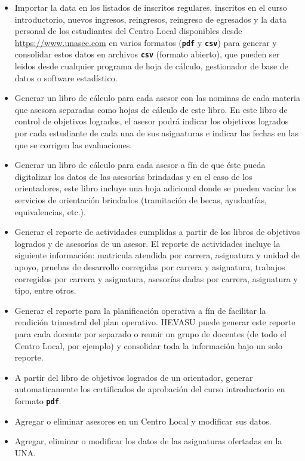 \documentclass[letterpaper,12pt]{book}
\newcommand{\fileformat}[1]{\textbf{\texttt{#1}}}
\begin{document}
\begin{itemize}
	\item Importar la data en los listados de inscritos regulares, inscritos en el curso introductorio, nuevos ingresos, reingresos, reingreso de egresados y la data personal de los estudiantes del Centro Local disponibles desde \url{https://www.unasec.com} en varios formatos (\fileformat{pdf} y \fileformat{csv}) para generar y consolidar estos datos en archivos \fileformat{csv} (formato abierto), que pueden ser leidos desde cualquier programa de hoja de cálculo, gestionador de base de datos o software estadístico.
	\item Generar un libro de cálculo para cada asesor con las nominas de cada materia que asesora separadas como hojas de cálculo de este libro. En este libro de control de objetivos logrados, el asesor podrá indicar los objetivos logrados por cada estudiante de cada una de sus asignaturas e indicar las fechas en las que se corrigen las evaluaciones.
	\item Generar un libro de cálculo para cada asesor a fín de que éste pueda digitalizar los datos de las asesorías brindadas y en el caso de los orientadores, este libro incluye una hoja adicional donde se pueden vaciar los servicios de orientación brindados (tramitación de becas, ayudantías, equivalencias, etc.).
	\item Generar el reporte de actividades cumplidas a partir de los libros de objetivos logrados y de asesorías de un asesor. El reporte de actividades incluye la siguiente información: matricula atendida por carrera, asignatura y unidad de apoyo, pruebas de desarrollo corregidas por carrera y asignatura, trabajos corregidos por carrera y asignatura, asesorías dadas por carrera, asignatura y tipo, entre otros.
	\item Generar el reporte para la planificación operativa a fín de facilitar la rendición trimestral del plan operativo.  HEVASU puede generar este reporte para cada docente por separado o reunir un grupo de docentes (de todo el Centro Local, por ejemplo) y consolidar toda la información bajo un solo reporte.
	\item A partir del libro de objetivos logrados de un orientador, generar automaticamente los certificados de aprobación del curso introductorio en formato \fileformat{pdf}.
	\item Agregar o eliminar asesores en un Centro Local y modificar sus datos.
	\item Agregar, eliminar o modificar los datos de las asignaturas ofertadas en la UNA.
\end{itemize}
\end{document}

